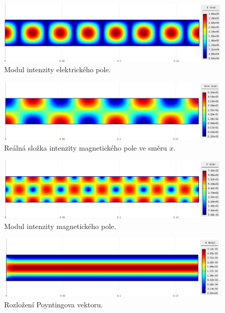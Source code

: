 \begin{figure}[!h]
	\centering
	\includegraphics[width=15cm]{priklad_R100_E.png}
	\caption{Modul intenzity elektrického pole.}
	\label{obr:priklad_R100_E}
\end{figure}
\begin{figure}[!h]
	\centering
	\includegraphics[width=15cm]{priklad_R100_Hre.png}
	\caption{Reálná složka intenzity magnetického pole ve směru $x$.}
	\label{obr:priklad_R100_Hre}
\end{figure}
\begin{figure}[!h]
	\centering
	\includegraphics[width=15cm]{priklad_R100_H.png}
	\caption{Modul intenzity magnetického pole.}
	\label{obr:priklad_R100_H}
\end{figure}
\begin{figure}[!h]
	\centering
	\includegraphics[width=15cm]{priklad_R100_N.png}
	\caption{Rozložení Poyntingova vektoru.}
	\label{obr:priklad_R100_N}
\end{figure}

